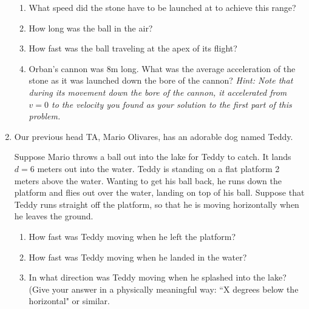 \documentclass[12pt]{article}
\begin{document}
\begin{enumerate}
\begin{enumerate}
\item What speed did the stone have to be launched at to achieve this range?
\item How long was the ball in the air?
\item How fast was the ball traveling at the apex of its flight?
\item Orban's cannon was 8m long. What was the average acceleration of the stone as it was launched down the bore of the cannon? {\it Hint: Note that during its movement down the bore of the cannon, it accelerated from $v=0$ to the velocity you found as your solution to the first part of this problem.}
\end{enumerate}


\bigskip


\item Our previous head TA, Mario Olivares, has an adorable dog named Teddy. 
\bigskip

	\begin{minipage}{0.5\textwidth}

	Suppose Mario throws a ball out into the lake for Teddy to catch. It lands $d=6$ meters out into the water. Teddy is standing on a flat platform 2 meters above the water. Wanting to get his ball back, he runs down the 
		platform and flies out over the water, landing on top of his ball. Suppose that Teddy runs straight off the platform, so that he is moving horizontally when he leaves the ground.

\begin{enumerate}
\item How fast was Teddy moving when he left the platform? 
\item How fast was Teddy moving when he landed in the water?
\item In what direction was Teddy moving when he splashed into the lake? (Give your answer in a physically meaningful way: ``X degrees below the horizontal" or similar.
\end{enumerate}


\end{minipage}
\end{enumerate}
\end{document}
